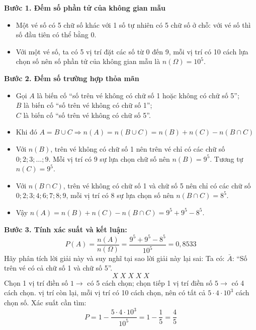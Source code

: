 \documentclass[12pt, a4paper]{article}
\begin{document}
	\vspace{0.2cm}
	\noindent\textbf{Bước 1. Đếm số phần tử của không gian mẫu}
	\begin{itemize}[leftmargin=*]
		\item Một vé số có 5 chữ số khác với 1 số tự nhiên có 5 chữ số ở chỗ: với vé số thì số đầu tiên có thể bằng 0.
		\item Với một vé số, ta có 5 vị trí đặt các số từ 0 đến 9, mỗi vị trí có 10 cách lựa chọn số nên số phần tử của không gian mẫu là $n(\Omega) = 10^5$.
	\end{itemize}	
	\noindent\textbf{Bước 2. Đếm số trường hợp thỏa mãn}
	\begin{itemize}[leftmargin=*]
		\item Gọi $A$ là biến cố ``số trên vé không có chữ số 1 hoặc không có chữ số 5'';\\
		$B$ là biến cố ``số trên vé không có chữ số 1'';\\
		$C$ là biến cố ``số trên vé không có chữ số 5''.
		\item Khi đó $A = B \cup C \Rightarrow n(A) = n(B \cup C) = n(B) + n(C) - n(B \cap C)$
		\item Với $n(B)$, trên vé không có chữ số 1 nên trên vé chỉ có các chữ số $0; 2; 3; \ldots; 9$. Mỗi vị trí có 9 sự lựa chọn chữ số nên $n(B) = 9^5$. Tương tự $n(C) = 9^5$.
		\item Với $n(B \cap C)$, trên vé không có chữ số 1 và chữ số 5 nên chỉ có các chữ số $0; 2; 3; 4; 6; 7; 8; 9$, mỗi vị trí có 8 sự lựa chọn số nên $n(B \cap C) = 8^5$.
		\item Vậy $n(A) = n(B) + n(C) - n(B \cap C) = 9^5 + 9^5 - 8^5$.
	\end{itemize}
	\noindent\textbf{Bước 3. Tính xác suất và kết luận:}
	\[
	P(A) = \frac{n(A)}{n(\Omega)} = \frac{9^5 + 9^5 - 8^5}{10^5} = \boxed{0{,}8533}
	\]	
	\vspace{0.3cm}
	\noindent Hãy phân tích lời giải này và suy nghĩ tại sao lời giải này lại sai:
	\noindent Ta có: $\bar{A}$: ``Số trên vé có cả chữ số 1 và chữ số 5''.
	\[
	X \; X \; X \; X \; X
	\]
	Chọn 1 vị trí điền số $1 \rightarrow$ có 5 cách chọn; chọn tiếp 1 vị trí điền số $5 \rightarrow$ có 4 cách chọn.	
	 vị trí còn lại, mỗi vị trí có 10 cách chọn, nên có tất cả $5 \cdot 4 \cdot 10^3$ cách chọn số.
	\noindent Xác suất cần tìm:
	\[
	P = 1 - \frac{5 \cdot 4 \cdot 10^3}{10^5} = 1 - \frac{1}{5} = \frac{4}{5}
	\]
	\vspace{0.5cm}
	\noindent{}
	
\end{document}
